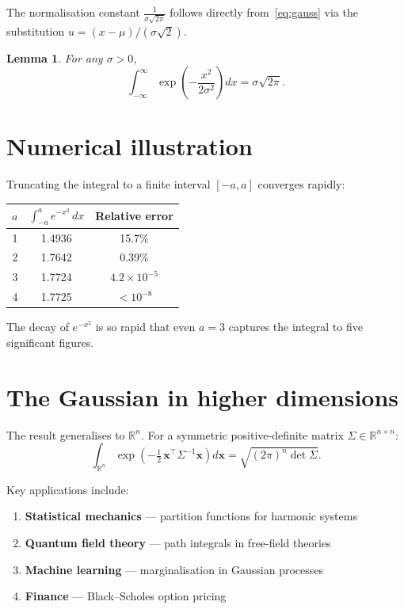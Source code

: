 \documentclass[11pt]{article}
\newtheorem{lemma}[theorem]{Lemma}
\begin{document}
The normalisation constant $\frac{1}{\sigma\sqrt{2\pi}}$ follows directly from~\eqref{eq:gauss} via the substitution $u = (x - \mu)/(\sigma\sqrt{2})$.

\begin{lemma}
For any $\sigma > 0$,
\[
  \int_{-\infty}^{\infty} \exp\!\left(-\frac{x^2}{2\sigma^2}\right) dx = \sigma\sqrt{2\pi}.
\]
\end{lemma}

\section{Numerical illustration}

Truncating the integral to a finite interval $[-a, a]$ converges rapidly:

\begin{center}
\begin{tabular}{rcc}
\hline
$a$ & $\displaystyle\int_{-a}^{a} e^{-x^2}\, dx$ & Relative error \\
\hline
1 & 1.4936 & 15.7\% \\
2 & 1.7642 & 0.39\% \\
3 & 1.7724 & $4.2 \times 10^{-5}$ \\
4 & 1.7725 & $< 10^{-8}$ \\
\hline
\end{tabular}
\end{center}

The decay of $e^{-x^2}$ is so rapid that even $a = 3$ captures the integral to five significant figures.

\section{The Gaussian in higher dimensions}

The result generalises to $\mathbb{R}^n$. For a symmetric positive-definite matrix $\Sigma \in \mathbb{R}^{n \times n}$:
\begin{equation}\label{eq:multivariate}
  \int_{\mathbb{R}^n} \exp\!\left(-\tfrac{1}{2}\, \mathbf{x}^\top \Sigma^{-1} \mathbf{x}\right) d\mathbf{x}
  = \sqrt{(2\pi)^n \det \Sigma}.
\end{equation}

Key applications include:
\begin{enumerate}[label=(\roman*)]
  \item \textbf{Statistical mechanics} --- partition functions for harmonic systems
  \item \textbf{Quantum field theory} --- path integrals in free-field theories
  \item \textbf{Machine learning} --- marginalisation in Gaussian processes
  \item \textbf{Finance} --- Black--Scholes option pricing
\end{enumerate}
\end{document}
